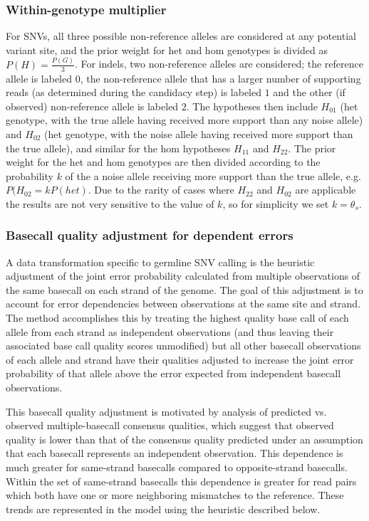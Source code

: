 \documentclass{article}
\begin{document}
\subsubsection{Within-genotype multiplier}
For SNVs, all three possible non-reference alleles are considered at any potential variant site, and the prior weight for het and hom genotypes is divided as $P(H) = \frac{P(G)}{3}$. For indels, two non-reference alleles are considered; the reference allele is labeled $0$, the non-reference allele that has a larger number of supporting reads (as determined during the candidacy step) is labeled $1$ and the other (if observed) non-reference allele is labeled $2$. The hypotheses then include $H_{01}$ (het genotype, with the true allele having received more support than any noise allele) and $H_{02}$ (het genotype, with the noise allele having received more support than the true allele), and similar for the hom hypotheses $H_{11}$ and $H_{22}$. The prior weight for the het and hom genotypes are then divided according to the probability $k$ of the a noise allele receiving more support than the true allele, e.g. $P(H_{02} = kP(het)$. Due to the rarity of cases where $H_{22}$ and $H_{02}$ are applicable the results are not very sensitive to the value of $k$, so for simplicity we set $k=\theta_s$.


\subsubsection{Basecall quality adjustment for dependent errors}
\label{sec:DepSiteErrorAdjustment}

A data transformation specific to germline SNV calling is the heuristic adjustment of the joint error probability calculated from multiple observations of the same basecall on each strand of the genome. The goal of this adjustment is to account for error dependencies between observations at the same site and strand. The method accomplishes this by treating the highest quality base call of each allele from each strand as independent observations (and thus leaving their associated base call quality scores unmodified) but all other basecall observations of each allele and strand have their qualities adjusted to increase the joint error probability of that allele above the error expected from independent basecall observations.

This basecall quality adjustment is motivated by analysis of predicted vs. observed multiple-basecall consensus qualities, which suggest that observed quality is lower than that of the consensus quality predicted under an assumption that each basecall represents an independent observation. This dependence is much greater for same-strand basecalls compared to opposite-strand basecalls. Within the set of same-strand basecalls this dependence is greater for read pairs which both have one or more neighboring mismatches to the reference. These trends are represented in the model using the heuristic described below.
\end{document}
